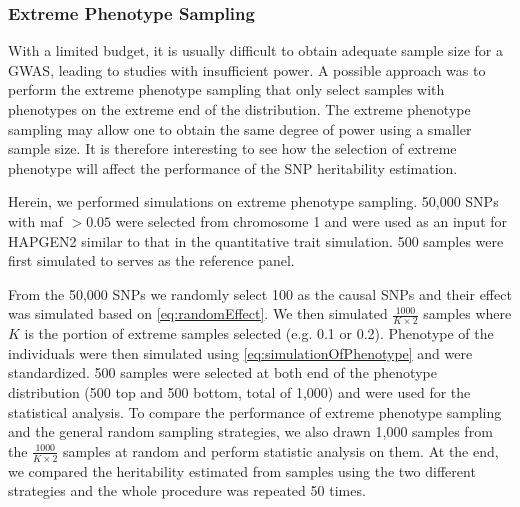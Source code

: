 		\subsubsection{Extreme Phenotype Sampling}
		With a limited budget, it is usually difficult to obtain adequate sample size for a \gls{GWAS}, leading to studies with insufficient power.
		A possible approach was to perform the extreme phenotype sampling that only select samples with phenotypes on the extreme end of the distribution.
		The extreme phenotype sampling may allow one to obtain the same degree of power using a smaller sample size.
		It is therefore interesting to see how the selection of extreme phenotype will affect the performance of the \gls{SNP} heritability estimation.
		
		Herein, we performed simulations on extreme phenotype sampling.
		50,000 \glspl{SNP} with \gls{maf} $>0.05$ were selected from chromosome 1 and were used as an input for HAPGEN2 similar to that in the quantitative trait simulation.
		500 samples were first simulated to serves as the reference panel. 
		
		From the 50,000 \glspl{SNP} we randomly select 100 as the causal \glspl{SNP} and their effect was simulated based on \cref{eq:randomEffect}.
		We then simulated $\frac{1000}{K\times2}$ samples where $K$ is the portion of extreme samples selected (e.g. 0.1 or 0.2).
		Phenotype of the individuals were then simulated using \cref{eq:simulationOfPhenotype} and were standardized.
		500 samples were selected at both end of the phenotype distribution (500 top and 500 bottom, total of 1,000) and were used for the statistical analysis. 
		To compare the performance of extreme phenotype sampling and the general random sampling strategies, we also drawn 1,000 samples from the $\frac{1000}{K\times2}$ samples at random and perform statistic analysis on them.
		At the end, we compared the heritability estimated from samples using the two different strategies and the whole procedure was repeated 50 times. 
		
